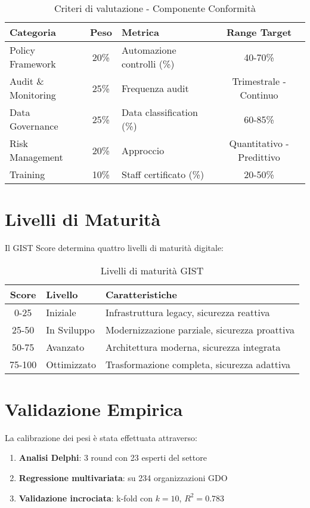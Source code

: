 \begin{table}[H]
\centering
\caption{Criteri di valutazione - Componente Conformità}
\small
\begin{tabular}{l c l c}
\toprule
\textbf{Categoria} & \textbf{Peso} & \textbf{Metrica} & \textbf{Range Target} \\
\midrule
Policy Framework & 20\% & Automazione controlli (\%) & 40-70\% \\
Audit \& Monitoring & 25\% & Frequenza audit & Trimestrale - Continuo \\
Data Governance & 25\% & Data classification (\%) & 60-85\% \\
Risk Management & 20\% & Approccio & Quantitativo - Predittivo \\
Training & 10\% & Staff certificato (\%) & 20-50\% \\
\bottomrule
\end{tabular}
\end{table}

\section{Livelli di Maturità}

Il GIST Score determina quattro livelli di maturità digitale:

\begin{table}[H]
\centering
\caption{Livelli di maturità GIST}
\begin{tabular}{c l l}
\toprule
\textbf{Score} & \textbf{Livello} & \textbf{Caratteristiche} \\
\midrule
0-25 & Iniziale & Infrastruttura legacy, sicurezza reattiva \\
25-50 & In Sviluppo & Modernizzazione parziale, sicurezza proattiva \\
50-75 & Avanzato & Architettura moderna, sicurezza integrata \\
75-100 & Ottimizzato & Trasformazione completa, sicurezza adattiva \\
\bottomrule
\end{tabular}
\end{table}

\section{Validazione Empirica}

La calibrazione dei pesi è stata effettuata attraverso:

\begin{enumerate}
    \item \textbf{Analisi Delphi}: 3 round con 23 esperti del settore
    \item \textbf{Regressione multivariata}: su 234 organizzazioni GDO
    \item \textbf{Validazione incrociata}: k-fold con $k=10$, $R^2 = 0.783$
\end{enumerate}

